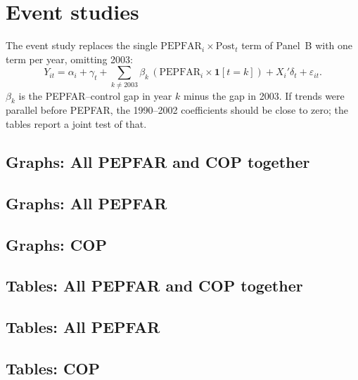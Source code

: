 \documentclass[11pt]{article}
\begin{document}
\section{Event studies}

The event study replaces the single $\text{PEPFAR}_i \times \text{Post}_t$ term of
Panel~B with one term per year, omitting 2003:
\begin{equation*}
Y_{it} = \alpha_i + \gamma_t + \sum_{k \neq 2003} \beta_k\,
         (\text{PEPFAR}_i \times \mathbf{1}[t = k]) + X_i' \delta_t + \varepsilon_{it}.
\end{equation*}
$\beta_k$ is the PEPFAR--control gap in year $k$ minus the gap in 2003. If trends were
parallel before PEPFAR, the 1990--2002 coefficients should be close to zero; the tables
report a joint test of that.

\subsection{Graphs: All PEPFAR and COP together}


\subsection{Graphs: All PEPFAR}


\subsection{Graphs: COP}


\subsection{Tables: All PEPFAR and COP together}


\subsection{Tables: All PEPFAR}


\clearpage

\subsection{Tables: COP}


\end{document}
